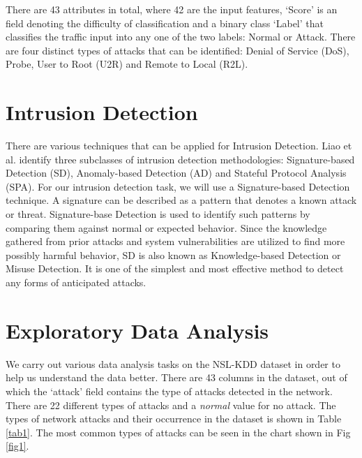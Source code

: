 \documentclass[conference]{IEEEtran}
\begin{document}
There are 43 attributes in total, where 42 are the input features, `Score' is an field denoting the difficulty of classification and a binary class `Label' that classifies the traffic input into any one of the two labels: Normal or Attack. There are four distinct types of attacks that can be identified: Denial of Service (DoS), Probe, User to Root (U2R) and Remote to Local (R2L).

\section{Intrusion Detection}
There are various techniques that can be applied for Intrusion Detection. Liao et al. \cite{b2} identify three subclasses of intrusion detection methodologies: Signature-based Detection (SD), Anomaly-based Detection (AD) and Stateful Protocol Analysis (SPA). For our intrusion detection task, we will use a Signature-based Detection technique. A signature can be described as a pattern that denotes a known attack or threat. Signature-base Detection is used to identify such patterns by comparing them against normal or expected behavior. Since the knowledge gathered from prior attacks and system vulnerabilities are utilized to find more possibly harmful behavior, SD is also known as Knowledge-based Detection or Misuse Detection. It is one of the simplest and most effective method to detect any forms of anticipated attacks.

\section{Exploratory Data Analysis}
We carry out various data analysis tasks on the NSL-KDD dataset in order to help us understand the data better. There are 43 columns in the dataset, out of which the `attack' field contains the type of attacks detected in the network. There are 22 different types of attacks and a \emph{normal} value for no attack. The types of network attacks and their occurrence in the dataset is shown in Table \ref{tab1}. The most common types of attacks can be seen in the chart shown in Fig \ref{fig1}.
\end{document}
